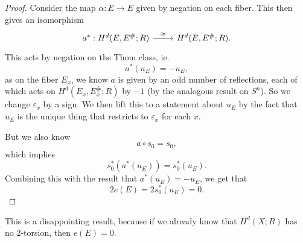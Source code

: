 \documentclass[a4paper]{article}
\theoremstyle{definition}
\begin{document}
\begin{proof}
  Consider the map $\alpha: E \to E$ given by negation on each fiber. This then gives an isomorphism
  \[
    \begin{tikzcd}
      a^*: H^d(E, E^\#; R) \ar[r, "\cong"] & H^d(E, E^\#; R).
    \end{tikzcd}
  \]
  This acts by negation on the Thom class, ie.
  \[
    a^*(u_E) = - u_E,
  \]
  as on the fiber $E_x$, we know $a$ is given by an odd number of reflections, each of which acts on $H^d(E_x, E_x^\#; R)$ by $-1$ (by the analogous result on $S^n$). So we change $\varepsilon_x$ by a sign. We then lift this to a statement about $u_E$ by the fact that $u_E$ is the unique thing that restricts to $\varepsilon_x$ for each $x$.

  But we also know
  \[
    a \circ s_0 = s_0,
  \]
  which implies
  \[
    s_0^*(a^*(u_E)) = s_0^*(u_E).
  \]
  Combining this with the result that $a^*(u_E) = -u_E$, we get that
  \[
    2 e(E) = 2 s_0^*(u_E) = 0.
  \]
\end{proof}
This is a disappointing result, because if we already know that $H^d(X; R)$ has no $2$-torsion, then $e(E) = 0$.
\end{document}
